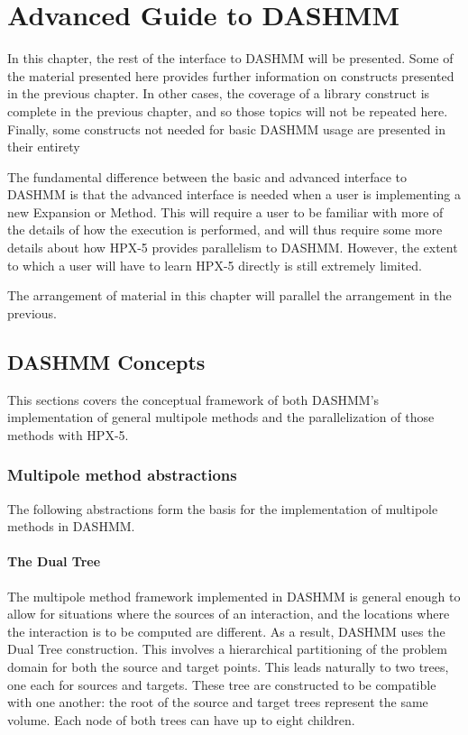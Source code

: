 \chapter{Advanced Guide to DASHMM}
\label{ch:advanced}

In this chapter, the rest of the interface to DASHMM will be presented. Some
of the material presented here provides further information on constructs
presented in the previous chapter. In other cases, the coverage of a library
construct is complete in the previous chapter, and so those topics will not be
repeated here. Finally, some constructs not needed for basic DASHMM usage
are presented in their entirety

The fundamental difference between the basic and advanced interface to
DASHMM is that the advanced interface is needed when a user is implementing
a new Expansion or Method. This will require a user to be familiar with more
of the details of how the execution is performed, and will thus require some
more details about how HPX-5 provides parallelism to DASHMM. However, the
extent to which a user will have to learn HPX-5 directly is still extremely
limited.

The arrangement of material in this chapter will parallel the arrangement in
the previous.

\section{DASHMM Concepts}
\label{sec:advconcepts}

This sections covers the conceptual framework of both DASHMM's implementation
of general multipole methods and the parallelization of those methods with
HPX-5.

\subsection{Multipole method abstractions}

The following abstractions form the basis for the implementation of multipole
methods in DASHMM.

\subsubsection{The Dual Tree}

The multipole method framework implemented in DASHMM is general enough to allow
for situations where the sources of an interaction, and the locations where the
interaction is to be computed are different. As a result, DASHMM uses the Dual
Tree construction. This involves a hierarchical partitioning of the problem
domain for both the source and target points. This leads naturally to two
trees, one each for sources and targets. These tree are constructed to be
compatible with one another: the root of the source and target trees represent
the same volume. Each node of both trees can have up to eight children.


